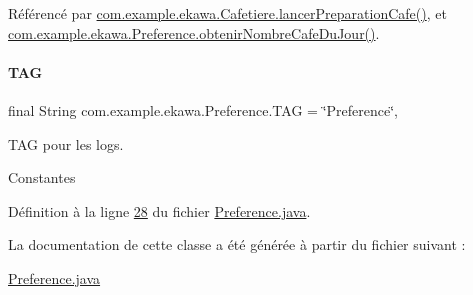 Référencé par \hyperlink{_cafetiere_8java_source_l00527}{com.\+example.\+ekawa.\+Cafetiere.\+lancer\+Preparation\+Cafe()}, et \hyperlink{_preference_8java_source_l00063}{com.\+example.\+ekawa.\+Preference.\+obtenir\+Nombre\+Cafe\+Du\+Jour()}.

\mbox{\label{classcom_1_1example_1_1ekawa_1_1_preference_aeb5e1e787153c37929839622ac5d0339}} 
\paragraph{\texorpdfstring{T\+AG}{TAG}}
{\footnotesize\ttfamily final String com.\+example.\+ekawa.\+Preference.\+T\+AG = \char`\"{}Preference\char`\"{}\hspace{0.3cm}{\ttfamily [static]}, {\ttfamily [private]}}



T\+AG pour les logs. 

Constantes 

Définition à la ligne \hyperlink{_preference_8java_source_l00028}{28} du fichier \hyperlink{_preference_8java_source}{Preference.\+java}.



La documentation de cette classe a été générée à partir du fichier suivant \+:\begin{DoxyCompactItemize}
\item 
\hyperlink{_preference_8java}{Preference.\+java}\end{DoxyCompactItemize}
